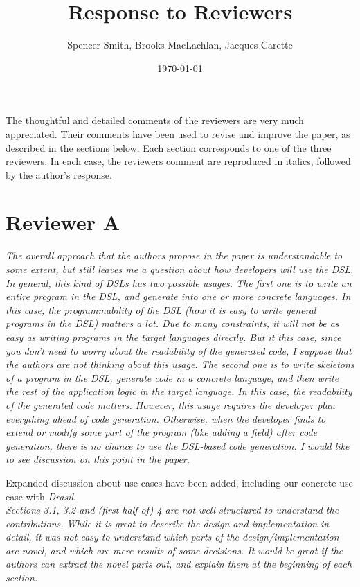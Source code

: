 \documentclass[12pt]{article}
\title{Response to Reviewers}
\author{Spencer Smith, Brooks MacLachlan, Jacques Carette}
\date{\today}
\begin{document}
\maketitle

The thoughtful and detailed comments of the reviewers are very much appreciated.
Their comments have been used to revise and improve the paper, as described in
the sections below.  Each section corresponds to one of the three reviewers.  In
each case, the reviewers comment are reproduced in italics, followed by the
author's response.

\section{Reviewer A}

\textit{The overall approach that the authors propose in the paper is 
understandable to some extent, but still leaves me a question about how 
developers will use the DSL.
	In general, this kind of DSLs has two possible usages.  The first one is to 
	write an entire program in the DSL, and generate into one or more concrete 
	languages.  In this case, the programmability of the DSL (how it is easy to 
	write general programs in the DSL) matters a lot.  Due to many constraints, 
	it will not be as easy as writing programs in the target languages 
	directly.  But it this case, since you don't need to worry about the 
	readability of the generated code, I suppose that the authors are not 
	thinking about this usage.
	The second one is to write skeletons of a program in the DSL, generate code 
	in a concrete language, and then write the rest of the application logic in 
	the target language.  In this case, the readability of the generated code 
	matters.  However, this usage requires the developer plan everything ahead 
	of code generation.  Otherwise, when the developer finds to extend or 
	modify some part of the program (like adding a field) after code 
	generation, there is no chance to use the DSL-based code generation.
	I would like to see discussion on this point in the paper.}

Expanded discussion about use cases have been added, including our concrete use 
case with \textit{Drasil}. \\

\noindent \textit{Sections 3.1, 3.2 and (first half of) 4 are not 
well-structured to 
understand the contributions.  While it is great to describe the design and 
implementation in detail, it was not easy to understand which parts of the 
design/implementation are novel, and which are mere results of some decisions.  
It would be great if the authors can extract the novel parts out, and explain 
them at the beginning of each section.}
\end{document}

